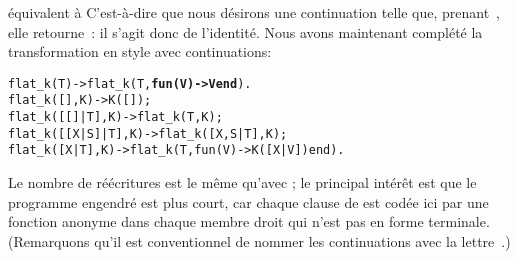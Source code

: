 équivalent à  C'est-à-dire que nous désirons
une continuation telle que, prenant~, elle
retourne~: il s'agit donc de l'identité. Nous avons
maintenant complété la transformation en style avec continuations:
\begin{alltt}
flat\_k(T)           -> flat\_k(T,\textbf{fun(V) -> V end}).
flat\_k(       [],K) -> K([]);
flat\_k(   [[]|T],K) -> flat\_k(T,K);
flat\_k([[X|S]|T],K) -> flat\_k([X,S|T],K);
flat\_k(    [X|T],K) -> flat\_k(T,fun(V) -> K([X|V]) end).
\end{alltt}
Le nombre de réécritures est le même qu'avec ; le
principal intérêt est que le programme engendré est plus court, car
chaque clause de  est codée ici par une fonction
anonyme dans chaque membre droit qui n'est pas en forme
terminale. (Remarquons qu'il est conventionnel de nommer les
continuations avec la lettre~.)

